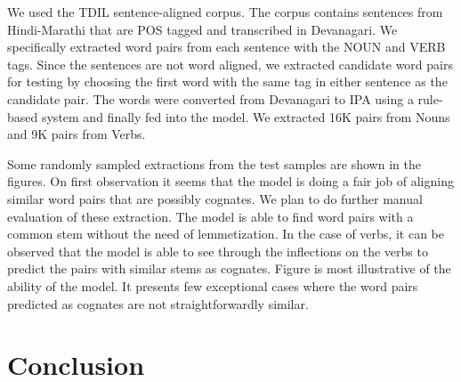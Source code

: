 \documentclass[11pt,letterpaper]{article}
\begin{document}
We used the TDIL sentence-aligned corpus. The corpus contains sentences from Hindi-Marathi that are POS tagged and transcribed in Devanagari. We specifically extracted word pairs from each sentence with the NOUN and VERB tags. Since the sentences are not word aligned, we extracted candidate word pairs for testing by choosing the first word with the same tag in either sentence as the candidate pair. The words were converted from Devanagari to IPA using a rule-based system and finally fed into the model. We extracted 16K pairs from Nouns and 9K pairs from Verbs.

Some randomly sampled extractions from the test samples are shown in the figures. On first observation it seems that the model is doing a fair job of aligning similar word pairs that are possibly cognates. We plan to do further manual evaluation of these extraction. The model is able to find word pairs with a common stem without the need of lemmetization. In the case of verbs, it can be observed that the model is able to see through the inflections on the verbs to predict the pairs with similar stems as cognates. Figure  is most illustrative of the ability of the model. It presents few exceptional cases where the word pairs predicted as cognates are not straightforwardly similar.




\section{Conclusion}




\end{document}
